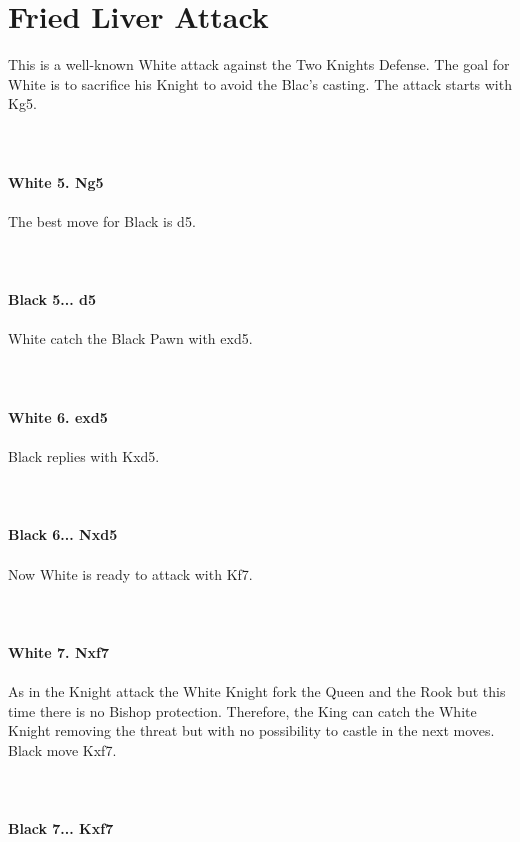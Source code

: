 \documentclass{article}
\begin{document}
\section{ Fried Liver Attack}

This is a well-known White attack against the Two Knights Defense. The goal for White is to sacrifice his Knight to avoid the Blac's casting. The attack starts with Kg5.\\
\\

\\
\\
\textbf{White 5. Ng5}\\
\\
The best move for Black is d5.\\
\\

\\
\\
\textbf{Black 5... d5}\\
\\
White catch the Black Pawn with exd5.\\
\\

\\
\\
\textbf{White 6. exd5}\\
\\
Black replies with Kxd5.\\
\\

\\
\\
\textbf{Black 6... Nxd5}\\
\\
Now White is ready to attack with Kf7.\\
\\

\\
\\
\textbf{White 7. Nxf7}\\
\\
As in the Knight attack the White Knight fork the Queen and the Rook but this time there is no Bishop protection. Therefore, the King can catch the White Knight removing the threat but with no possibility to castle in the next moves. Black move Kxf7.\\
\\

\\
\\
\textbf{Black 7... Kxf7}\\
\\
\\
\\
\end{document}
